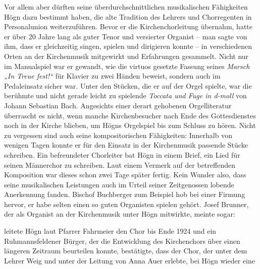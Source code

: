 Vor allem aber dürften seine überdurchschnittlichen musikalischen
Fähigkeiten Högn dazu bestimmt haben, die alte Tradition des Lehrers
und Chorregenten in Personalunion weiterzuführen. Bevor er die
Kirchenchorleitung übernahm, hatte er über 20 Jahre lang als guter
Tenor und versierter Organist – man sagte von ihm, dass er gleichzeitig
singen, spielen und dirigieren konnte – in verschiedenen Orten an der
Kirchenmusik mitgewirkt und Erfahrungen gesammelt. Nicht nur im
Manualspiel war er gewandt, wie die virtuos gesetzte Fassung seines
\textit{Marsch „In Treue fest!“} für Klavier zu zwei Händen beweist,
sondern auch im Pedaleinsatz sicher war. Unter den Stücken, die er auf
der Orgel spielte, war die berühmte und nicht gerade leicht zu
spielende \textit{Toccata und Fuge in d-moll} von Johann Sebastian
Bach. Angesichts einer derart gehobenen Orgelliteratur überrascht es
nicht, wenn manche Kirchenbesucher nach Ende des Gottesdienstes noch in
der Kirche blieben, um Högns Orgelspiel bis zum Schluss zu hören. Nicht
zu vergessen sind auch seine kompositorischen Fähigkeiten: Innerhalb
von wenigen Tagen konnte er für den Einsatz in der Kirchenmusik
passende Stücke schreiben. Ein befreundeter Chorleiter bat Högn in
einem Brief, ein Lied für seinen Männerchor zu schreiben. Laut einem
Vermerk auf der betreffenden Komposition war dieses schon zwei Tage
später fertig. Kein Wunder also, dass seine musikalischen Leistungen
auch im Urteil seiner Zeitgenossen lobende Anerkennung fanden. Bischof
Buchberger zum Beispiel hob bei einer Firmung hervor, er habe selten
einen so guten Organisten spielen gehört. Josef Brunner, der als
Organist an der Kirchenmusik unter Högn mitwirkte, meinte sogar:

 leitete Högn laut Pfarrer Fahrmeier den Chor bis Ende
1924 und ein Ruhmannsfeldener Bürger, der die Entwicklung des
Kirchenchors über einen längeren Zeitraum beurteilen konnte,
bestätigte, dass der Chor, der unter dem Lehrer Weig
 und unter der Leitung von
Anna Auer  erlebte, bei Högn wieder
eine 

